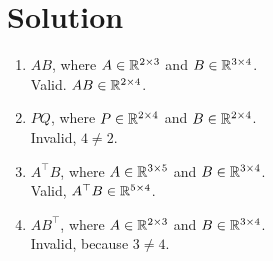 \documentclass[twocolumn]{article}
\begin{document}
\section{Solution}
  \begin{enumerate}
  \item $AB$, where $A \in \mathbb{R}^{2 \times 3}$ and $B \in \mathbb{R}^{3 \times 4}$.
    \\
    Valid. $AB \in \mathbb{R}^{2 \times 4}$.
  \item $PQ$, where $P \in \mathbb{R}^{2 \times 4}$ and $B \in \mathbb{R}^{2 \times 4}$.
    \\
    Invalid, $4 \ne 2$.
  \item $A^\top B$, where $A \in \mathbb{R}^{3 \times 5}$ and $B \in \mathbb{R}^{3 \times 4}$.
    \\
    Valid, $A^\top B \in \mathbb{R}^{5 \times 4}$.
  \item $AB^\top$, where $A \in \mathbb{R}^{2 \times 3}$ and $B \in \mathbb{R}^{3 \times
      4}$.
    \\
    Invalid, because $3 \ne 4$.


\end{enumerate}
\end{document}
